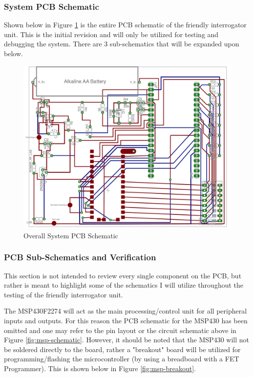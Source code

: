 \documentclass[letterpaper,10pt]{article}
\begin{document}
\begin{spacing}{1.15}
\subsubsection{System PCB Schematic}
Shown below in Figure \ref{fig:system-pcb} is the entire PCB schematic of the friendly interrogator unit. This is the initial revision and will only be utilized for testing and debugging the system. There are 3 sub-schematics that will be expanded upon below.
\begin{figure} [H]
	\centering
	\includegraphics[scale=0.4]{system-pcb.png}
	\caption{Overall System PCB Schematic\label{fig:system-pcb}}
\end{figure}

\subsubsection{PCB Sub-Schematics and Verification}
This section is not intended to review every single component on the PCB, but rather is meant to highlight some of the schematics I will utilize throughout the testing of the friendly interrogator unit.

The MSP430F2274 will act as the main processing/control unit for all peripheral inputs and outputs. For this reason the PCB schematic for the MSP430 has been omitted and one may refer to the pin layout or the circuit schematic above in Figure \ref{fig:msp-schematic}. However, it should be noted that the MSP430 will not be soldered directly to the board, rather a "breakout" board will be utilized for programming/flashing the microcontroller (by using a breadboard with a FET Programmer). This is shown below in Figure \ref{fig:msp-breakout}.


\end{spacing}
\end{document}

